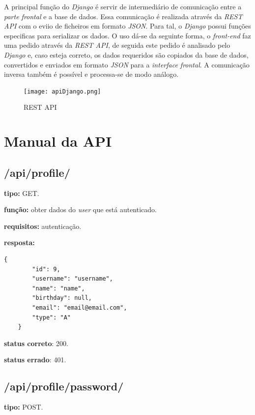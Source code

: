 \documentclass[11pt,a4paper]{report}
\begin{document}
A principal função do \emph{Django} é servir de intermediário de comunicação entre a \emph{parte frontal} e a base de dados. Essa comunicação é realizada através da \emph{REST API} com o eviio de ficheiros em formato \emph{JSON}. Para tal, o \emph{Django} possui funções especificas para serializar os dados. O uso dá-se da seguinte forma, o \emph{front-end} faz uma pedido através da \emph{REST API}, de seguida este pedido é analisado pelo \emph{Django} e, caso esteja correto, os dados requeridos são copiados da base de dados, convertidos e enviados em formato \emph{JSON} para a \emph{interface frontal}. A comunicação inversa também é possível e processa-se de modo análogo.
\newline\newline

\begin{figure}[h]
\centering
\texttt{[image: apiDjango.png]}
\caption{REST API}
\label{fig:pagDJang}
\end{figure}

\newpage

\section{Manual da API}

\subsection{/api/profile/}

\textbf{tipo:} GET.

\textbf{função:} obter dados do \emph{user} que está autenticado.

\textbf{requisitos:} autenticação.

\textbf{resposta:}

\begin{lstlisting}[style = code]
    {
        "id": 9,
        "username": "username",
        "name": "name",
        "birthday": null,
        "email": "email@email.com",
        "type": "A"
    }
\end{lstlisting}

\textbf{status correto}: 200.

\textbf{status errado}: 401.

\subsection{/api/profile/password/}

\textbf{tipo:} POST.
\end{document}
